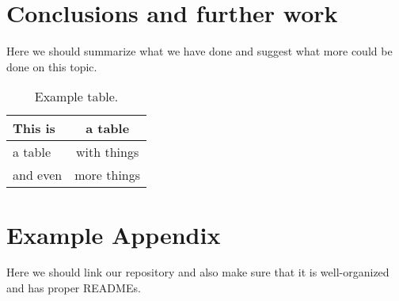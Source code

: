 \documentclass[11pt]{article}
\begin{document}
\section{Conclusions and further work}

Here we should summarize what we have done and suggest what more could be done on this topic.

\begin{table}
\centering
\begin{tabular}{lc}
\hline
\textbf{This is} & \textbf{a table}\\
\hline
a table & with things \\
and even & more things  \\\hline
\end{tabular}
\caption{Example table.}
\label{tab:accents}
\end{table}



\appendix

\section{Example Appendix}
\label{sec:appendix}

Here we should link our repository and also make sure that it is well-organized and has proper READMEs.
\end{document}
